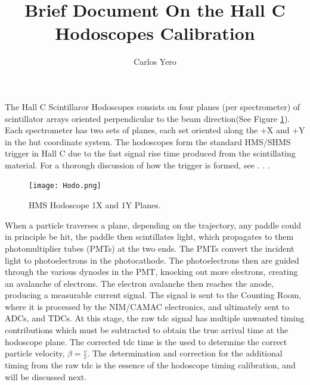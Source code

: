 \documentclass[14pt]{article}
\begin{document}
 
 
\title{\textbf{Brief Document On the Hall C Hodoscopes Calibration}}%
\author{Carlos Yero} %
 
\maketitle
\noindent The Hall C Scintillaror Hodoscopes consists on four planes (per spectrometer) of scintillator arrays oriented perpendicular
to the beam direction(See Figure \ref{fig:Hodo}). Each spectrometer has two sets of planes, each set oriented along the +X and +Y in the hut coordinate system.
The hodoscopes form the standard HMS/SHMS trigger in Hall C due to the fast signal rise time produced from the scintillating material.
For a thorough discussion of how the trigger is formed, see . . . \\
\begin{figure}[H]
  \captionsetup{justification=raggedright,singlelinecheck=false}
  \texttt{[image: Hodo.png]}
  \caption{HMS Hodoscope 1X and 1Y Planes.}
  \label{fig:Hodo}
\end{figure}
When a particle traverses a plane, depending on the trajectory, any paddle could in principle be hit,
the paddle then scintillates light, which propagates to them photomultiplier tubes (PMTs) at the two ends. The PMTs
convert the incident light to photoelectrons in the photocathode. The photoelectrons then are guided through the various dynodes in the PMT, knocking
out more electrons, creating an avalanche of electrons. The electron avalanche then reaches the anode, producing a measurable current signal.
The signal is sent to the Counting Room, where it is processed by the NIM/CAMAC electronics, and ultimately sent to ADCs, and TDCs. At this stage, the raw tdc signal
has multiple unwanted timing contributions which must be subtracted to obtain the true arrival time at the hodoscope plane. The corrected tdc time is the used to determine
the correct particle velocity, $\beta = \frac{v}{c}$. The determination and correction for the additional timing from the raw tdc is the essence of the hodoscope timing
calibration, and will be discussed next.
\end{document}
